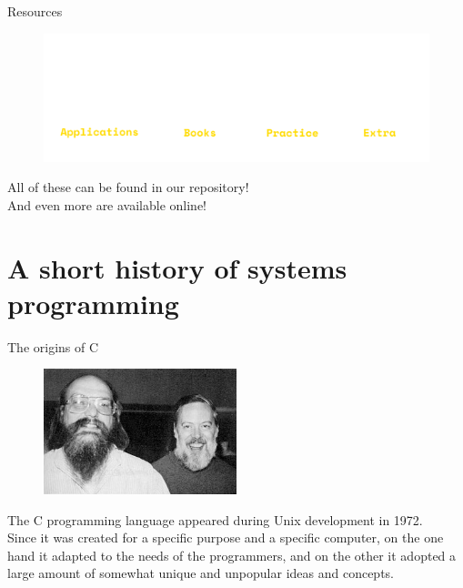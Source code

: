 \documentclass[usenames,dvipsnames,10pt,aspectratio=169]{beamer}
\begin{document}
\begin{frame}{Resources}
	\Large
	\centering
	\begin{figure}[c]
		\includegraphics[width=1\linewidth]{graphics/resources.png}
	\end{figure}
	All of these can be found in our repository!\\
	And even more are available online!\\
	\vspace{1cm}
\end{frame}




\section{A short history of systems programming}

\begin{frame}{The origins of C}

\begin{figure}
\centering
\includegraphics[width=0.5\textwidth]{graphics/ritchie.jpg}
\end{figure}
\normalsize
The C programming language appeared during Unix development in 1972.\\
\vspace{0.3cm}
Since it was created for a specific purpose %
and a specific computer, %
on the one hand it adapted to the
needs of the programmers, and on the 
other it adopted a large
amount of somewhat unique and unpopular 
ideas and concepts.

\vskip 0.8cm

\end{frame}
\end{document}
